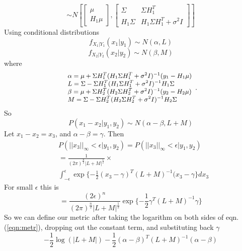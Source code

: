 \documentclass{article}
\begin{document}
\begin{equation}
 \sim N \left[\begin{bmatrix} \mu \\ H_1 \mu \end{bmatrix}, \begin{bmatrix} \Sigma & \Sigma H_1^T \\ H_1 \Sigma & H_1 \Sigma H_1^T + \sigma^2 I \end{bmatrix} \right]
\end{equation}
\noindent
Using conditional distributions
 \begin{equation}
  f_{X_1|Y_1}(x_1|y_1) \sim N(\alpha, L)
 \end{equation}
\begin{equation}
  f_{X_2|Y_2}(x_2|y_2) \sim N(\beta, M)
 \end{equation}
where 
\begin{equation}
\small{
\begin{array}{l}\alpha = \mu + \Sigma H_1^T (H_1 \Sigma H_1^T + \sigma^2 I)^{-1} (y_1 - H_1 \mu) \\ L = \Sigma - \Sigma H_1^T (H_1 \Sigma H_1^T + \sigma^2 I)^{-1} H_1 \Sigma \\ \beta = \mu + \Sigma H_2^T (H_2 \Sigma H_2^T + \sigma^2 I)^{-1} (y_2 - H_2 \mu) \\ M = \Sigma - \Sigma H_2^T (H_2 \Sigma H_2^T + \sigma^2 I)^{-1} H_2 \Sigma        \end{array}}   .
\end{equation}
So
\begin{equation}
P(x_1 - x_2|y_1, y_2) \sim N(\alpha-\beta, L+M)
\end{equation}
Let $x_1 - x_2 = x_3$, and $\alpha -\beta=\gamma$. Then
\begin{align}
&P(||x_3||_{\infty} < \epsilon|y_1,y_2)   \nonumber
										 =	 P(||x_3||_{\infty} < \epsilon|y_1,y_2)\\ \nonumber
										&=   \frac{1}{(2 \pi)^{\frac{n}{2}} |L+M|^ \frac{1}{2}} \times \\ 
										& \int_{-\epsilon }^{\epsilon}\exp \{ -\frac{1}{2}(x_3 - \gamma)^T(L+M)^{-1}(x_3 - \gamma\}dx_3 
\end{align}
For small $\epsilon$ this is
\begin{equation}
= \frac{(2 \epsilon)^n}{(2 \pi)^{\frac{n}{2}} |L + M|^{\frac{1}{2}}} \exp\{-\frac{1}{2}\gamma^T(L+M)^{-1}\gamma\} 
\label{eqn:metr}
\end{equation}
So we can define our metric after taking the logarithm on both sides of eqn.(\ref{eqn:metr}), dropping out the constant term, and substituting back $\gamma$
\begin{equation}
 -\frac{1}{2}\log(|L + M|) -\frac{1}{2}(\alpha - \beta)^T(L+M)^{-1}(\alpha -\beta)
\end{equation}
\end{document}
